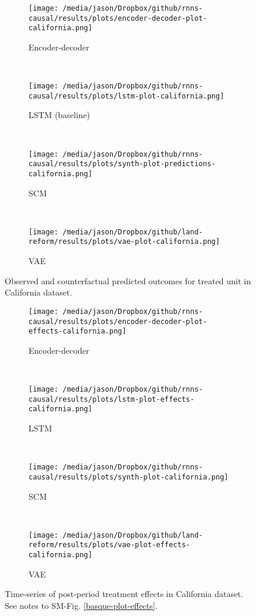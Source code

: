 \documentclass[12pt]{article}
\begin{document}
\begin{figure*}[htbp] %
    \centering
    \begin{subfigure}[t]{0.5\textwidth}
        \centering
        \texttt{[image: /media/jason/Dropbox/github/rnns-causal/results/plots/encoder-decoder-plot-california.png]}
        \caption{Encoder-decoder}
    \end{subfigure}%
        ~ 
    \begin{subfigure}[t]{0.5\textwidth}
        \centering
        \texttt{[image: /media/jason/Dropbox/github/rnns-causal/results/plots/lstm-plot-california.png]}
        \caption{LSTM (baseline)}
    \end{subfigure}
        ~ 
    \begin{subfigure}[t]{0.5\textwidth}
        \centering
        \texttt{[image: /media/jason/Dropbox/github/rnns-causal/results/plots/synth-plot-predictions-california.png]}
        \caption{SCM}
    \end{subfigure}%
         ~ 
	\begin{subfigure}[t]{0.5\textwidth}
		\centering
		\texttt{[image: /media/jason/Dropbox/github/land-reform/results/plots/vae-plot-california.png]}
		\caption{VAE}
	\end{subfigure}
    \caption{Observed and counterfactual predicted outcomes for treated unit in California dataset.\label{california-plot}}
\end{figure*}

\begin{figure*}[htbp]
	\centering
	\begin{subfigure}[t]{0.5\textwidth}
		\centering
		\texttt{[image: /media/jason/Dropbox/github/rnns-causal/results/plots/encoder-decoder-plot-effects-california.png]}
		\caption{Encoder-decoder}
	\end{subfigure}%
	~ 
	\begin{subfigure}[t]{0.5\textwidth}
		\centering
		\texttt{[image: /media/jason/Dropbox/github/rnns-causal/results/plots/lstm-plot-effects-california.png]}
		\caption{LSTM}
	\end{subfigure}
	~ 
	\begin{subfigure}[t]{0.5\textwidth}
		\centering
		\texttt{[image: /media/jason/Dropbox/github/rnns-causal/results/plots/synth-plot-california.png]}
		\caption{SCM}
	\end{subfigure}%
	~ 
	\begin{subfigure}[t]{0.5\textwidth}
		\centering
		\texttt{[image: /media/jason/Dropbox/github/land-reform/results/plots/vae-plot-effects-california.png]}
		\caption{VAE}
	\end{subfigure}
	\caption{Time-series of post-period treatment effects in California dataset. See notes to SM-Fig. \ref{basque-plot-effects}.\label{california-plot-effects}}
\end{figure*}
\end{document}
